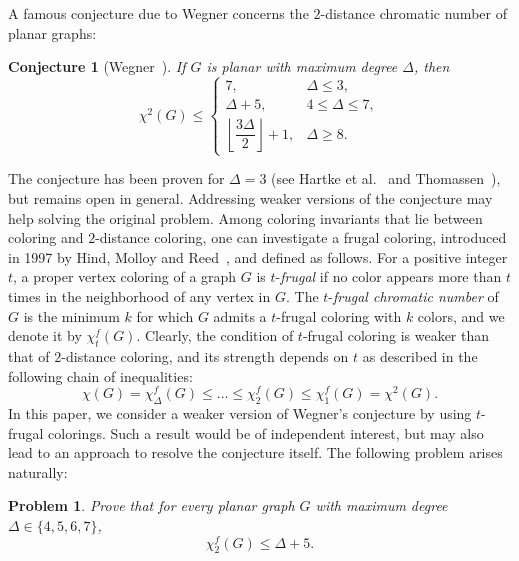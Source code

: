 \documentclass[11pt]{article}
\newcommand{\fd}{\chi_{2}^{f}}
\newtheorem{problem}[theorem]{Problem}
\newtheorem{conjecture}[theorem]{Conjecture}
\begin{document}
A famous conjecture due to Wegner \cite{wegner} concerns the $2$-distance chromatic number of planar graphs:

\begin{conjecture}[Wegner~\cite{wegner}]
If $G$ is planar with maximum degree $\Delta$, then
\[
\chi^2(G) \leq 
\begin{cases}
7, & \Delta \leq 3, \\
\Delta + 5, & 4 \leq \Delta \leq 7, \\
\left\lfloor \dfrac{3\Delta}{2} \right\rfloor + 1, & \Delta \geq 8.
\end{cases}
\]
\label{conj:W}
\end{conjecture}

The conjecture has been proven for $\Delta=3$ (see Hartke et al.~\cite{HJT} and Thomassen~\cite{th-2018}), but remains open in general. 
Addressing weaker versions of the conjecture may help solving the original problem. %
Among coloring invariants that lie between coloring and $2$-distance coloring, one can investigate a frugal coloring, introduced in 1997 by Hind, Molloy and Reed~\cite{HMR}, and defined as follows. 
For a positive integer $t$, a proper vertex coloring of a graph $G$ is $t$-\textit{frugal} if no color appears more than $t$ times in the neighborhood of any vertex in $G$. The $t$-\textit{frugal chromatic number} of $G$ is the minimum $k$ for which $G$ admits a $t$-frugal coloring with $k$ colors, and we denote it by $\chi_t^f(G)$. Clearly, the condition of $t$-frugal coloring is weaker than that of $2$-distance coloring, and its strength depends on $t$ as described in the following chain of inequalities:
$$\chi(G)=\chi_{\Delta}^{f}(G)\leq \ldots\leq \chi_{2}^{f}(G)\leq \chi_{1}^{f}(G)=\chi^2(G).$$
In this paper, we consider a weaker version of Wegner's conjecture by using $t$-frugal colorings. Such a result would be of independent interest, but may also lead to an approach to resolve the conjecture itself.  The following problem arises naturally:

\begin{problem}
\label{p:limited1}
Prove that for every planar graph $G$ with maximum degree $\Delta\in \{4,5,6,7\}$, $$\fd(G)\le \Delta+5. $$ 
\end{problem}
\end{document}

